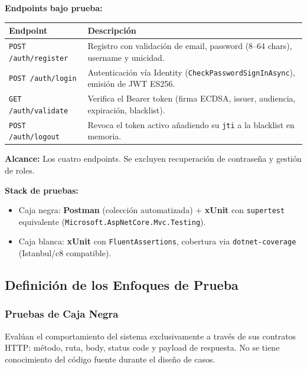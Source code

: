 \documentclass[11pt,a4paper]{article}
\begin{document}
\noindent\textbf{Endpoints bajo prueba:}

\begin{center}
\renewcommand{\arraystretch}{1.3}
\begin{tabular}{|p{4cm}|p{8cm}|}
\hline
\rowcolor{headerblue}\color{white}\textbf{Endpoint} & \color{white}\textbf{Descripción} \\
\hline
\texttt{POST /auth/register} & Registro con validación de email, password (8--64 chars), username y unicidad. \\
\hline
\rowcolor{rowgray}
\texttt{POST /auth/login} & Autenticación vía Identity (\texttt{CheckPasswordSignInAsync}), emisión de JWT ES256. \\
\hline
\texttt{GET /auth/validate} & Verifica el Bearer token (firma ECDSA, issuer, audiencia, expiración, blacklist). \\
\hline
\rowcolor{rowgray}
\texttt{POST /auth/logout} & Revoca el token activo añadiendo su \texttt{jti} a la blacklist en memoria. \\
\hline
\end{tabular}
\end{center}

\noindent\textbf{Alcance:} Los cuatro endpoints. Se excluyen recuperación de contraseña y gestión de roles.

\noindent\textbf{Stack de pruebas:}
\begin{itemize}[itemsep=2pt]
    \item Caja negra: \textbf{Postman} (colección automatizada) + \textbf{xUnit} con \texttt{supertest} equivalente (\texttt{Microsoft.AspNetCore.Mvc.Testing}).
    \item Caja blanca: \textbf{xUnit} con \texttt{FluentAssertions}, cobertura via \texttt{dotnet-coverage} (Istanbul/c8 compatible).
\end{itemize}

\subsection{Definición de los Enfoques de Prueba}

\subsubsection{Pruebas de Caja Negra}

Evalúan el comportamiento del sistema exclusivamente a través de sus contratos HTTP: método, ruta, body, status code y payload de respuesta. No se tiene conocimiento del código fuente durante el diseño de casos.
\end{document}
